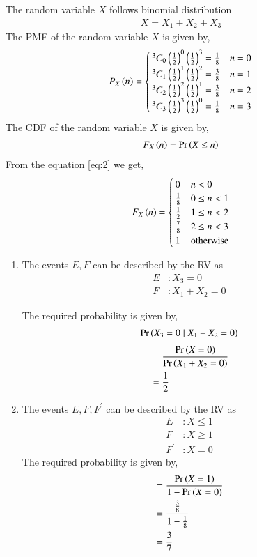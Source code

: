 \documentclass[journal,12pt,twocolumn]{IEEEtran}
\begin{document}
\begin{enumerate}
The random variable $X$ follows binomial distribution
\begin{align}
X = X_1 + X_2 + X_3
\end{align}
The PMF of the random variable $X$ is given by,
\begin{align}
P_{X}\left(n\right) = 
\begin{cases}
{^{3}C_{0} \ensuremath{\left(\frac{1}{2}\right)}^0 \ensuremath{\left(\frac{1}{2}\right)}^3} = \frac{1}{8} & n = 0 \\
{^{3}C_{1} \left(\frac{1}{2}\right)^1 \left(\frac{1}{2}\right)^2} = \frac{3}{8} & n = 1 \\
{^{3}C_{2} \left(\frac{1}{2}\right)^2 \left(\frac{1}{2}\right)^1} = \frac{3}{8} & n = 2 \\
{^{3}C_{3} \left(\frac{1}{2}\right)^3 \left(\frac{1}{2}\right)^0} = \frac{1}{8} & n = 3 
\end{cases}
\end{align}
The CDF of the random variable $X$ is given by,
\begin{align}
F_{X}\left(n\right) = 	\Pr\left(X \le n\right) \label{eq:2}
\end{align}
From the equation \eqref{eq:2} we get,
\begin{align}
F_{X}\left(n\right) = 
\begin{cases}
0 & n < 0 \\
\frac{1}{8} & 0 \leq n < 1 \\
\frac{1}{2} & 1 \leq n < 2 \\
\frac{7}{8} & 2 \leq n < 3 \\
1 & \text{otherwise}
\end{cases}
\end{align}

\begin{enumerate}
\item  The events $E, F$ can be described by the RV as
\begin{align}
E &: X_3 = 0\\
F &: X_1 + X_2 = 0 
\end{align}

The required probability is given by,
\begin{align}
\Pr\left(X_3 = 0 \mid X_1 + X_2 = 0\right)
\end{align}
\begin{align}
&= \frac{\Pr\left(X = 0\right)}{\Pr\left(X_1 + X_2 = 0\right)}\\
&= \frac{1}{2}
\end{align}

\item  The events $E, F, F^{\prime}$ can be described by the RV as
\begin{align}
E &: X \leq 1\\
F &: X \geq 1\\
F^{\prime} &: X = 0 
\end{align}
The required probability is given by,
\begin{align}
&= \frac{\Pr\left(X = 1\right)}{1 - \Pr\left(X = 0\right)}\\
&= \frac{\frac{3}{8}}{1-\frac{1}{8}}\\
&= \frac{3}{7}
\end{align}



\end{enumerate}
\end{enumerate}
\end{document}
